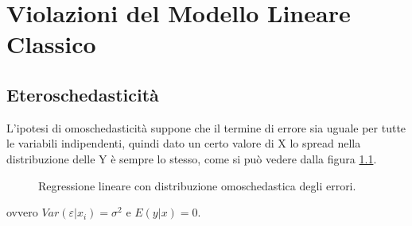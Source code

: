 \chapter{Violazioni del Modello Lineare Classico}

\section{Eteroschedasticità}
L'ipotesi di omoschedasticità suppone che il termine di errore sia uguale per tutte le variabili indipendenti, quindi dato un certo valore di X lo spread nella distribuzione delle Y è sempre lo stesso, come si può vedere dalla figura \ref{fig:regressione-omoschedastica}.
\begin{figure}
	\centering
	\caption{Regressione lineare con distribuzione omoschedastica degli errori.}
	\label{fig:regressione-omoschedastica}
\end{figure} 
ovvero $Var(\varepsilon \vert x_i) = \sigma^2$ e $E(y \vert x) = 0$.

